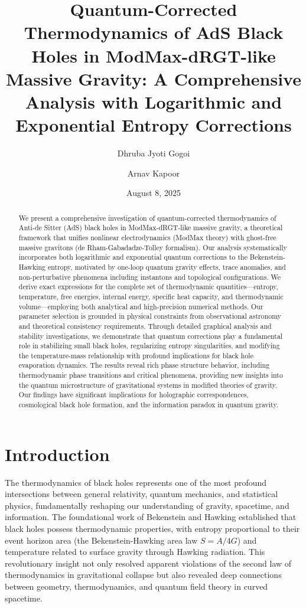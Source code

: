 \documentclass[12pt]{article}
\title{Quantum-Corrected Thermodynamics of AdS Black Holes in ModMax-dRGT-like Massive Gravity: A Comprehensive Analysis with Logarithmic and Exponential Entropy Corrections}
\author[1]{Dhruba Jyoti Gogoi}
\author[2]{Arnav Kapoor}
\affil[1]{Department of Physics, Moran College, Moranhat, Charaideo 785670, Assam, India}
\affil[2]{Department of Electrical Engineering and Computer Science (EECS), IISER Bhopal, Madhya Pradesh, India}
\date{August 8, 2025}
\begin{document}
\maketitle

\begin{abstract}
We present a comprehensive investigation of quantum-corrected thermodynamics of Anti-de Sitter (AdS) black holes in ModMax-dRGT-like massive gravity, a theoretical framework that unifies nonlinear electrodynamics (ModMax theory) with ghost-free massive gravitons (de Rham-Gabadadze-Tolley formalism). Our analysis systematically incorporates both logarithmic and exponential quantum corrections to the Bekenstein-Hawking entropy, motivated by one-loop quantum gravity effects, trace anomalies, and non-perturbative phenomena including instantons and topological configurations. We derive exact expressions for the complete set of thermodynamic quantities—entropy, temperature, free energies, internal energy, specific heat capacity, and thermodynamic volume—employing both analytical and high-precision numerical methods. Our parameter selection is grounded in physical constraints from observational astronomy and theoretical consistency requirements. Through detailed graphical analysis and stability investigations, we demonstrate that quantum corrections play a fundamental role in stabilizing small black holes, regularizing entropy singularities, and modifying the temperature-mass relationship with profound implications for black hole evaporation dynamics. The results reveal rich phase structure behavior, including thermodynamic phase transitions and critical phenomena, providing new insights into the quantum microstructure of gravitational systems in modified theories of gravity. Our findings have significant implications for holographic correspondences, cosmological black hole formation, and the information paradox in quantum gravity.
\end{abstract}

\section{Introduction}

The thermodynamics of black holes represents one of the most profound intersections between general relativity, quantum mechanics, and statistical physics, fundamentally reshaping our understanding of gravity, spacetime, and information. The foundational work of Bekenstein \cite{Bekenstein1973} and Hawking \cite{Hawking1974,Hawking1975} established that black holes possess thermodynamic properties, with entropy proportional to their event horizon area (the Bekenstein-Hawking area law $S = A/4G$) and temperature related to surface gravity through Hawking radiation. This revolutionary insight not only resolved apparent violations of the second law of thermodynamics in gravitational collapse but also revealed deep connections between geometry, thermodynamics, and quantum field theory in curved spacetime.
\end{document}
